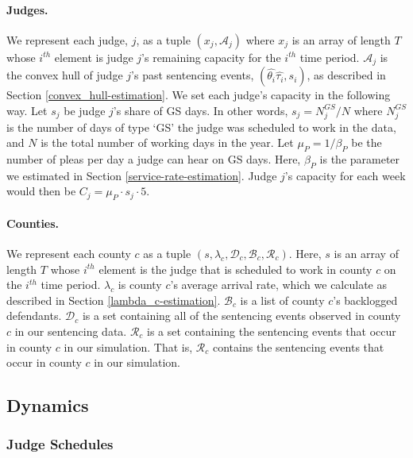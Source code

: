 \documentclass[11pt, oneside]{article}   	%
\theoremstyle{ModifiedStyle}
\begin{document}
	  \paragraph{Judges.} We represent each judge, $j$, as a tuple $(x_j,\mathcal{A}_j)$ where $x_j$ is an array of length $T$ whose $i^{th}$ element is judge $j$'s remaining capacity for the $i^{th}$ time period. $\mathcal{A}_j$ is the convex hull of judge $j$'s past sentencing events, $(\hat{\theta_i}\hat{\tau_i},s_i)$, as described in Section \ref{convex_hull-estimation}. We set each judge's capacity in the following way. Let $s_j$ be judge $j$'s share of GS days. In other words, $s_j = N^{GS}_j/N$ where $N^{GS}_j$ is the number of days of type `GS' the judge was scheduled to work in the data, and $N$ is the total number of working days in the year. Let $\mu_P= 1/\beta_P$ be the number of pleas per day a judge can hear on GS days. Here, $\beta_P$ is the parameter we estimated in Section \ref{service-rate-estimation}. Judge $j$'s capacity for each week would then be $C_j = \mu_P \cdot s_j \cdot 5$.

	  \paragraph{Counties.} We represent each county $c$ as a tuple $(s,\lambda_c,\mathcal{D}_c,\mathcal{B}_c,\mathcal{R}_c)$. Here, $s$ is an array of length $T$ whose $i^{th}$ element is the judge that is scheduled to work in county $c$ on the $i^{th}$ time period. $\lambda_c$ is county $c$'s average arrival rate, which we calculate as described in Section \ref{lambda_c-estimation}. $\mathcal{B}_c$ is a list of county $c$'s backlogged defendants. $\mathcal{D}_c$ is a set containing all of the sentencing events observed in county $c$ in our sentencing data. $\mathcal{R}_c$ is a set containing the sentencing events that occur in county $c$ in our simulation. That is, $\mathcal{R}_c$ contains the sentencing events that occur in county $c$ in our simulation.

	\subsection{Dynamics}
	  \subsubsection{Judge Schedules}
\end{document}
